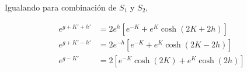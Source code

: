 \documentclass[10pt]{article}
\begin{document}
Igualando para combinaci\'on de $S_1$ y $S_2$,

\begin{align}
e^{g+K'+h'} &= 2e^{h}\left[e^{-K} + e^K\cosh(2K+2h) \right] \label{eq:b3_Rec1}\\
e^{g+K'-h'} &= 2e^{-h}\left[e^{-K} + e^K\cosh(2K-2h) \right]\label{eq:b3_Rec2} \\
e^{g-K'} &= 2\left[ e^{-K} \cosh(2K) + e^K \cosh(2h) \right] \label{eq:b3_Rec3}
\end{align}
 
\end{document}
